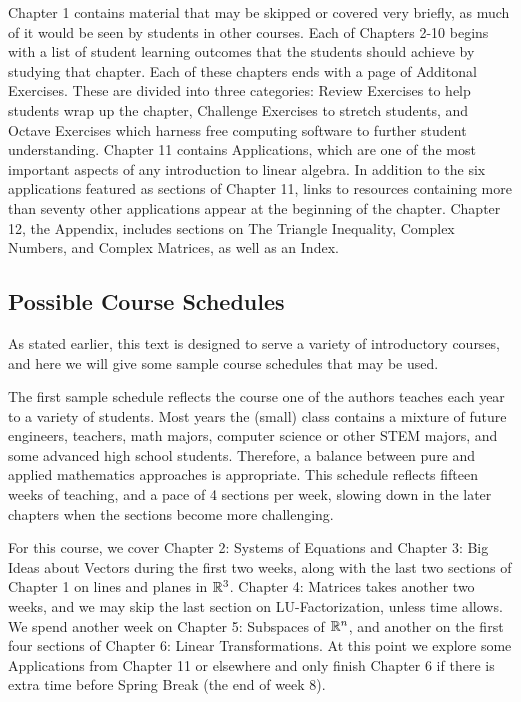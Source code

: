 \documentclass{ximera}
\begin{document}
Chapter 1 contains material that may be skipped or covered very briefly, as much of it would be seen by students in other courses.  Each of Chapters 2-10 begins with a list of student learning outcomes that the students should achieve by studying that chapter.  Each of these chapters ends with a page of Additonal Exercises.  These are divided into three categories: Review Exercises to help students wrap up the chapter, Challenge Exercises to stretch students, and Octave Exercises which harness free computing software to further student understanding.  Chapter 11 contains Applications, which are one of the most important aspects of any introduction to linear algebra.  In addition to the six applications featured as sections of Chapter 11, links to resources containing more than seventy other applications appear at the beginning of the chapter.  Chapter 12, the Appendix, includes sections on The Triangle Inequality, Complex Numbers, and Complex Matrices, as well as an Index.


\subsection{Possible Course Schedules}

As stated earlier, this text is designed to serve a variety of introductory courses, and here we will give some sample course schedules that may be used.

The first sample schedule reflects the course one of the authors teaches each year to a variety of students.  Most years the (small) class contains a mixture of future engineers, teachers, math majors, computer science or other STEM majors, and some advanced high school students.  Therefore, a balance between pure and applied mathematics approaches is appropriate.  This schedule reflects fifteen weeks of teaching, and a pace of 4 sections per week, slowing down in the later chapters when the sections become more challenging.  

For this course, we cover Chapter 2: Systems of Equations and Chapter 3: Big Ideas about Vectors during the first two weeks, along with the last two sections of Chapter 1 on lines and planes in $\mathbb{R}^3$.  Chapter 4: Matrices takes another two weeks, and we may skip the last section on LU-Factorization, unless time allows.  We spend another week on Chapter 5: Subspaces of $\mathbb{R}^n$, and another on the first four sections of Chapter 6: Linear Transformations.  At this point we explore some Applications from Chapter 11 or elsewhere and only finish Chapter 6 if there is extra time before Spring Break (the end of week 8).
\end{document}
